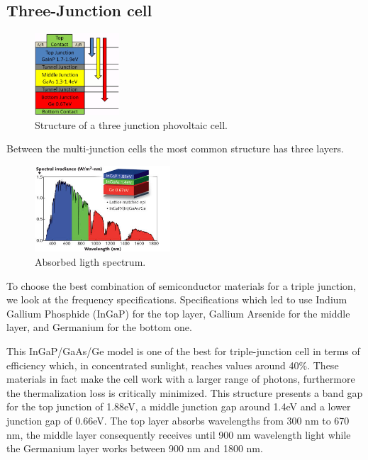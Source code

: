 \documentclass[11pt]{article} %
\begin{document}
\subsection{Three-Junction cell}

\begin{figure}
	\centering
	\includegraphics[width=0.28\textwidth]{img/f2big.png}
	\caption{Structure of a three junction phovoltaic cell.}
\end{figure}

Between the multi-junction cells the most common structure has three layers.  

\begin{figure}
	\centering
	\includegraphics[width=0.45\textwidth]{img/1212LFW04f2.jpg}
	\caption{Absorbed ligth spectrum.}
	\vspace{-10pt}
\end{figure}

To choose the best combination of semiconductor materials for a triple junction, we look at the frequency specifications. Specifications which led to use Indium Gallium Phosphide (InGaP) for the top layer, Gallium Arsenide for the middle layer, and Germanium for the bottom one. 

This InGaP/GaAs/Ge model is one of the best for triple-junction cell in terms of efficiency which, in concentrated sunlight, reaches values around 40\%. These materials in fact make the cell work with a larger range of photons, furthermore the thermalization loss is critically minimized. This structure presents a band gap for the top junction of 1.88eV, a middle junction gap around 1.4eV and a lower junction gap of 0.66eV. The top layer absorbs wavelengths from 300 nm to 670 nm, the middle layer consequently receives until 900 nm wavelength light while the Germanium layer works between 900 nm and 1800 nm. 
\end{document}
